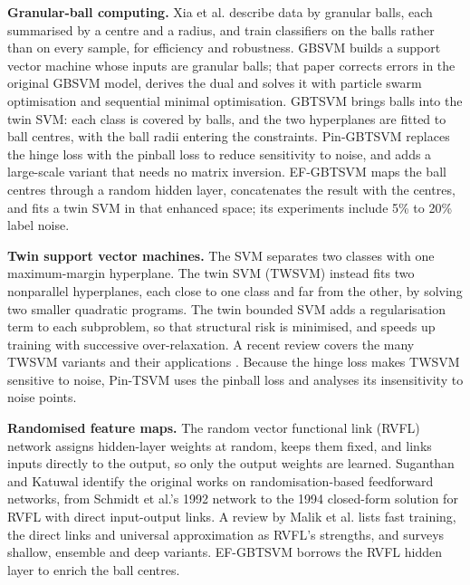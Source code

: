 \documentclass[conference,a4paper]{IEEEtran}
\begin{document}
\textbf{Granular-ball computing.} Xia et al. \cite{r24} describe data by granular balls, each summarised by a centre and a radius, and train classifiers on the balls rather than on every sample, for efficiency and robustness. GBSVM \cite{r32} builds a support vector machine whose inputs are granular balls; that paper corrects errors in the original GBSVM model, derives the dual and solves it with particle swarm optimisation and sequential minimal optimisation. GBTSVM \cite{r30} brings balls into the twin SVM: each class is covered by balls, and the two hyperplanes are fitted to ball centres, with the ball radii entering the constraints. Pin-GBTSVM \cite{r31} replaces the hinge loss with the pinball loss to reduce sensitivity to noise, and adds a large-scale variant that needs no matrix inversion. EF-GBTSVM \cite{r29} maps the ball centres through a random hidden layer, concatenates the result with the centres, and fits a twin SVM in that enhanced space; its experiments include 5\% to 20\% label noise.

\textbf{Twin support vector machines.} The SVM \cite{r5} separates two classes with one maximum-margin hyperplane. The twin SVM (TWSVM) \cite{r9} instead fits two nonparallel hyperplanes, each close to one class and far from the other, by solving two smaller quadratic programs. The twin bounded SVM \cite{r13} adds a regularisation term to each subproblem, so that structural risk is minimised, and speeds up training with successive over-relaxation. A recent review covers the many TWSVM variants and their applications \cite{r28}. Because the hinge loss makes TWSVM sensitive to noise, Pin-TSVM \cite{r21} uses the pinball loss and analyses its insensitivity to noise points.

\textbf{Randomised feature maps.} The random vector functional link (RVFL) network \cite{r4} assigns hidden-layer weights at random, keeps them fixed, and links inputs directly to the output, so only the output weights are learned. Suganthan and Katuwal \cite{r25} identify the original works on randomisation-based feedforward networks, from Schmidt et al.'s 1992 network to the 1994 closed-form solution for RVFL with direct input-output links. A review by Malik et al. \cite{r27} lists fast training, the direct links and universal approximation as RVFL's strengths, and surveys shallow, ensemble and deep variants. EF-GBTSVM borrows the RVFL hidden layer to enrich the ball centres.
\end{document}
